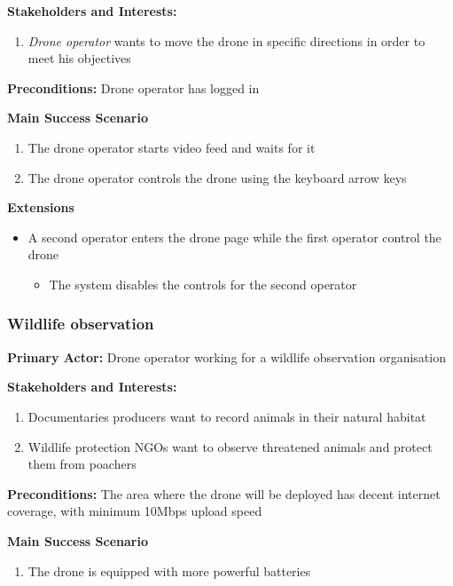 \textbf{Stakeholders and Interests:}
\begin{enumerate}
    \item \textit{Drone operator} wants to move the drone in specific directions in order to meet his objectives
\end{enumerate}

\textbf{Preconditions:} Drone operator has logged in

\textbf{Main Success Scenario}
\begin{enumerate}
    \item The drone operator starts video feed and waits for it
    \item The drone operator controls the drone using the keyboard arrow keys
\end{enumerate}

\textbf{Extensions}
\begin{itemize}
    \item A second operator enters the drone page while the first operator control the drone
            \begin{itemize}
                \item The system disables the controls for the second operator
            \end{itemize}
\end{itemize}


\subsubsection{\textbf{Wildlife observation}}

\textbf{Primary Actor:} Drone operator working for a wildlife observation organisation

\textbf{Stakeholders and Interests:}
\begin{enumerate}
    \item Documentaries producers want to record animals in their natural habitat
    \item Wildlife protection NGOs want to observe threatened animals and protect them from poachers
\end{enumerate}

\textbf{Preconditions:} The area where the drone will be deployed has decent internet coverage, with minimum 10Mbps upload speed

\textbf{Main Success Scenario}  %
\begin{enumerate}
    \item The drone is equipped with more powerful batteries
\end{enumerate}


